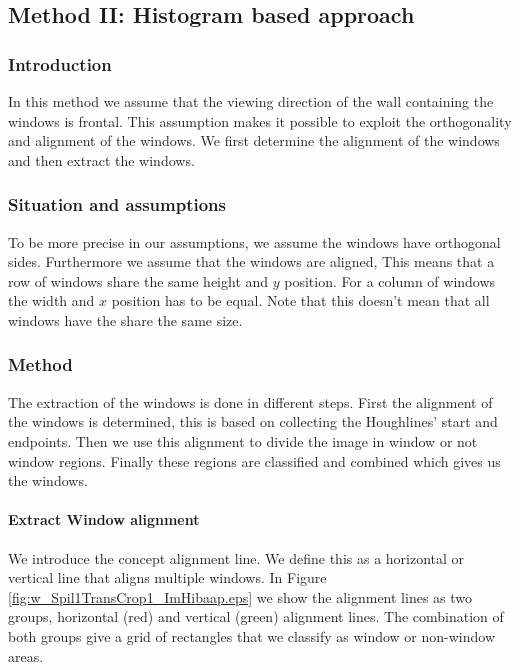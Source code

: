 \subsection{Method II: Histogram based approach} 
\subsubsection{Introduction}
In this method we assume that the viewing direction of the wall containing the 
windows is frontal. This assumption makes it possible to exploit the orthogonality and
alignment of the windows.  We first determine the alignment of the windows and
then extract the windows. 


\subsubsection{Situation and assumptions}
To be more precise in our assumptions, we assume the windows have orthogonal sides.  Furthermore we
assume that the windows are aligned, This means that a row of windows share the
same height and $y$ position. For a column of windows the width and $x$
position has to be equal.  Note that this doesn't mean that all windows have the
share the same size.

\subsubsection{Method}
The extraction of the windows is done in different steps. 
First the alignment of the windows is determined, this is based on collecting
the Houghlines' start and endpoints. Then we use this alignment to divide the
image in window or not window regions.  Finally these regions are classified
and combined which gives us the windows.


\paragraph{Extract Window alignment}
We introduce the concept alignment line. We define this as a horizontal or
vertical line that aligns multiple windows. In Figure
\ref{fig:w_Spil1TransCrop1_ImHibaap.eps}
we show the alignment lines as two groups, horizontal (red) and
vertical (green) alignment lines.  The combination of both groups give a grid of
rectangles that we classify as window or non-window areas.\\

